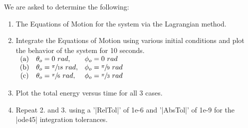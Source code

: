 \documentclass[12pt]{report}
\begin{document}
\begin{flushleft}
We are asked to determine the following: \\
\begin{enumerate}
  \item The Equations of Motion for the system via the Lagrangian method.
  \item Integrate the Equations of Motion using various initial conditions and plot
  the behavior of the system for 10 seconds. \\
  \vspace{2ex}
  $
  \begin{array}{cll}
    \text{(a)} & \theta_o = 0~rad, & \phi_o = 0~rad \\
    \text{(b)} & \theta_o = \sfrac{\pi}{18}~rad, & \phi_o = \sfrac{\pi}{9}~rad \\
    \text{(c)} & \theta_o = \sfrac{\pi}{6}~rad, & \phi_o = \sfrac{\pi}{3}~rad \\
  \end{array}
  $
  \item Plot the total energy versus time for all 3 cases.
  \item Repeat 2. and 3. using a '|RelTol|' of 1e-6 and '|AbsTol|' of 1e-9 for the
  |ode45| integration tolerances.
\end{enumerate}
\newpage

\end{flushleft}
\end{document}
